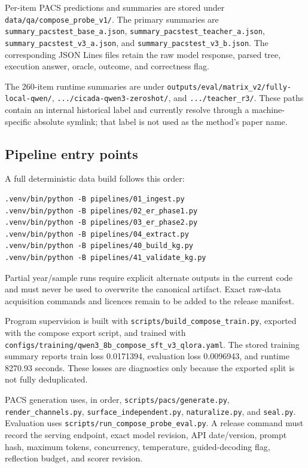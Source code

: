 Per-item PACS predictions and summaries are stored under
\texttt{data/qa/compose\_probe\_v1/}.  The primary summaries are
\texttt{summary\_pacstest\_base\_a.json},
\texttt{summary\_pacstest\_teacher\_a.json},
\texttt{summary\_pacstest\_v3\_a.json}, and
\texttt{summary\_pacstest\_v3\_b.json}.  The corresponding JSON Lines files retain the raw
model response, parsed tree, execution answer, oracle, outcome, and correctness flag.

The 260-item runtime summaries are under
\texttt{outputs/eval/matrix\_v2/fully-local-qwen/},
\texttt{.../cicada-qwen3-zeroshot/}, and \texttt{.../teacher\_r3/}.  These paths contain an
internal historical label and currently resolve through a machine-specific absolute symlink;
that label is not used as the method's paper name.

\subsection{Pipeline entry points}

A full deterministic data build follows this order:
\begin{verbatim}
.venv/bin/python -B pipelines/01_ingest.py
.venv/bin/python -B pipelines/02_er_phase1.py
.venv/bin/python -B pipelines/03_er_phase2.py
.venv/bin/python -B pipelines/04_extract.py
.venv/bin/python -B pipelines/40_build_kg.py
.venv/bin/python -B pipelines/41_validate_kg.py
\end{verbatim}
Partial year/sample runs require explicit alternate outputs in the current code and must never
be used to overwrite the canonical artifact.  Exact raw-data acquisition commands and licences
remain to be added to the release manifest.

Program supervision is built with \texttt{scripts/build\_compose\_train.py}, exported with the
compose export script, and trained with
\texttt{configs/training/qwen3\_8b\_compose\_sft\_v3\_qlora.yaml}.  The stored training summary
reports train loss 0.0171394, evaluation loss 0.0096943, and runtime 8270.93 seconds.  These losses
are diagnostics only because the exported split is not fully deduplicated.

PACS generation uses, in order,
\texttt{scripts/pacs/generate.py}, \texttt{render\_channels.py},
\texttt{surface\_independent.py}, \texttt{naturalize.py}, and \texttt{seal.py}.  Evaluation uses
\texttt{scripts/run\_compose\_probe\_eval.py}.  A release command must record the serving
endpoint, exact model revision, API date/version, prompt hash, maximum tokens, concurrency,
temperature, guided-decoding flag, reflection budget, and scorer revision.


